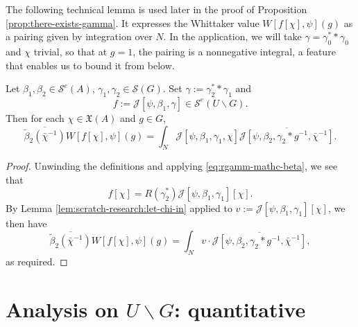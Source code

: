 The following technical lemma is used later in the proof of Proposition \ref{prop:there-exists-gamma}.  It expresses the Whittaker value $W[f[\chi], \psi](g)$ as a pairing given by integration over $N$.  In the application, we will take $\gamma = \gamma_0^* \ast \gamma_0$ and $\chi$ trivial, so that at $g = 1$, the pairing is a nonnegative integral, a feature that enables us to bound it from below.
\begin{lemma}\label{lem:scratch-research:let-beta_1-beta_2}
  Let $\beta_1, \beta_2 \in \mathcal{S}^e(A)$, $\gamma_1, \gamma_2 \in \mathcal{S}(G)$.  Set $\gamma := \gamma_2^* \ast \gamma_1$ and
  \begin{equation*}
    f := \mathcal{J}[\psi, \beta_1, \gamma] \in \mathcal{S}^e(U \backslash G).
  \end{equation*}
  Then for each $\chi \in \mathfrak{X}(A)$ and $g \in G$,
  \begin{equation*}
    \overline{\tilde{\beta}_2(\bar{\chi}^{-1})}
    W[f[\chi], \psi](g)
    =
    \int_{N}
    \mathcal{J}[\psi, \beta_1, \gamma_1, \chi]
    \overline{\mathcal{J}[\psi, \beta_2, \gamma_2 \ast g^{-1}, \bar{\chi}^{-1}]}.
  \end{equation*}
\end{lemma}
\begin{proof}
  Unwinding the definitions and applying \eqref{eq:rgamm-mathc-beta}, we see that
  \begin{equation*}
    f[\chi] = R(\gamma_2^*) \mathcal{J}[\psi,\beta_1,\gamma_1][\chi].
  \end{equation*}
  By Lemma \ref{lem:scratch-research:let-chi-in} applied to $v := \mathcal{J}[\psi,\beta_1,\gamma_1][\chi]$,
  we then have
  \begin{equation*}
    \overline{\tilde{\beta}_2(\bar{\chi}^{-1})}
    W[f[\chi], \psi](g)
    =
    \int_N v \cdot \overline{\mathcal{J}[\psi,\beta_2, \gamma_2 \ast g^{-1}, \bar{\chi}^{-1}]},
  \end{equation*}
  as required.
\end{proof}

\section{Analysis on $U \backslash G$: quantitative}\label{sec:cunt6n2c9p}

